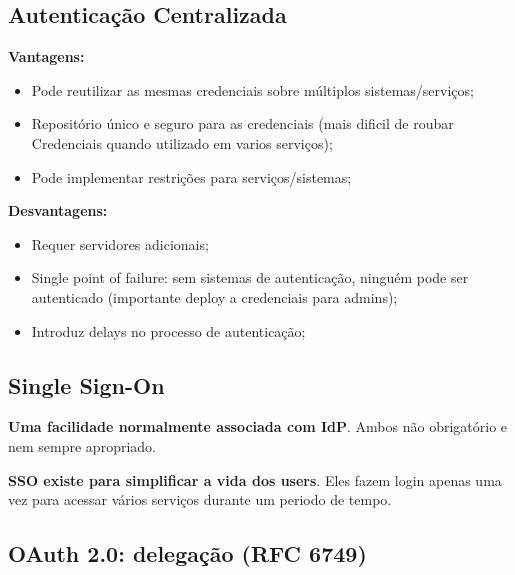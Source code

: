 \documentclass{article}
\begin{document}
\subsection{Autenticação Centralizada}

\begin{flushleft}
  \textbf{Vantagens:}
  \begin{itemize}
    \item Pode reutilizar as mesmas credenciais sobre múltiplos sistemas/serviços;
    \item Repositório único e seguro para as credenciais (mais dificil de roubar Credenciais
    quando utilizado em varios serviços);
    \item Pode implementar restrições para serviços/sistemas;
  \end{itemize}

  \vspace{2mm}

  \textbf{Desvantagens:}
  \begin{itemize}
    \item Requer servidores adicionais;
    \item Single point of failure: sem sistemas de autenticação, ninguém
    pode ser autenticado (importante deploy a credenciais para admins);
    \item Introduz delays no processo de autenticação;
  \end{itemize}
\end{flushleft}

\subsection{Single Sign-On}

\begin{flushleft}
  \textbf{Uma facilidade normalmente associada com IdP}. Ambos
  não obrigatório e nem sempre apropriado.

  \vspace{2mm}

  \textbf{SSO existe para simplificar a vida dos users}. Eles fazem login
  apenas uma vez para acessar vários serviços durante um periodo de tempo.
\end{flushleft}

\pagebreak

\subsection{OAuth 2.0: delegação (RFC 6749)}
\end{document}

